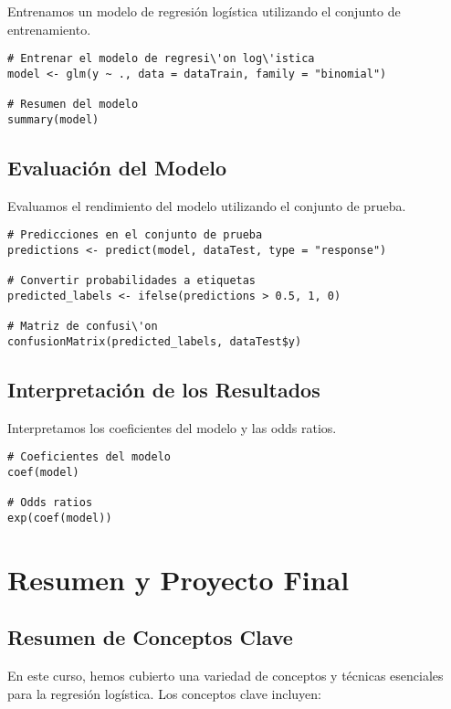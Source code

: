 \documentclass[a4paper]{report} %
\begin{document}
Entrenamos un modelo de regresi\'on log\'istica utilizando el conjunto de entrenamiento.

\begin{verbatim}
# Entrenar el modelo de regresi\'on log\'istica
model <- glm(y ~ ., data = dataTrain, family = "binomial")

# Resumen del modelo
summary(model)
\end{verbatim}

\section{Evaluaci\'on del Modelo}

Evaluamos el rendimiento del modelo utilizando el conjunto de prueba.

\begin{verbatim}
# Predicciones en el conjunto de prueba
predictions <- predict(model, dataTest, type = "response")

# Convertir probabilidades a etiquetas
predicted_labels <- ifelse(predictions > 0.5, 1, 0)

# Matriz de confusi\'on
confusionMatrix(predicted_labels, dataTest$y)
\end{verbatim}

\section{Interpretaci\'on de los Resultados}

Interpretamos los coeficientes del modelo y las odds ratios.

\begin{verbatim}
# Coeficientes del modelo
coef(model)

# Odds ratios
exp(coef(model))
\end{verbatim}



\chapter{Resumen y Proyecto Final}
\section{Resumen de Conceptos Clave}

En este curso, hemos cubierto una variedad de conceptos y t\'ecnicas esenciales para la regresi\'on log\'istica. Los conceptos clave incluyen:
\end{document}
